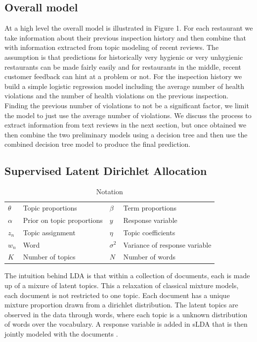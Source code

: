 \documentclass{article}
\begin{document}
\subsection{Overall model}
At a high level the overall model is illustrated in Figure 1. For each restaurant we take information about their 
previous inspection history and then combine that with information extracted from topic modeling of recent reviews. The 
assumption is that predictions for historically very hygienic or very unhygienic restaurants can be made fairly easily and for
restaurants in the middle, recent customer feedback can hint at a problem or not. For the inspection history we build a simple
logistic regression model including the average number of health violations and the number of health violations on the
previous inspection. Finding the previous number of violations to not be a significant factor, we limit the model to just
use the average number of violations. We discuss the process to extract information from text reviews in the next section, 
but once obtained we then combine the two preliminary models using a decision tree and then use the combined decision tree 
model to produce the final prediction.

\subsection{Supervised Latent Dirichlet Allocation}

\begin{table}[h]
\begin{center}
\begin{tabular}{l l l l }
$\theta$ & Topic proportions & $\beta$ & Term proportions \\
$\alpha$ & Prior on topic proportions & $y$ & Response variable \\
$z_{n}$ & Topic assignment & $\eta$ & Topic coefficients \\
$w_{n}$ & Word & $\sigma^{2}$ & Variance of response variable\\
$K$ & Number of topics & $N$ & Number of words \\
\end{tabular}
\end{center}
\label{notation}
\caption{Notation}
\end{table}



The intuition behind LDA is that within a collection of documents, each is made up of a mixure of latent topics. This a
relaxation of classical mixture models, each document is not restricted to one topic. Each document has a unique mixture 
proportion drawn from a dirichlet distribution. The latent topics are observed in the data through words, where each topic is 
a unknown distribution of words over the vocabulary. A response variable is added in sLDA that is then jointly modeled with 
the documents \cite{mcauliffe}.
\end{document}

